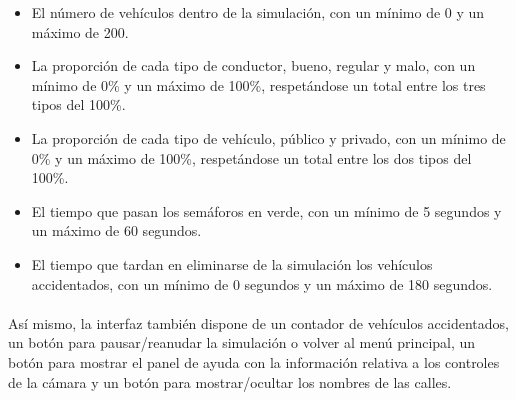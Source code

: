 	\begin{itemize}
	\item El número de vehículos dentro de la simulación, con un mínimo de 0 y un máximo de 200.
	\item La proporción de cada tipo de conductor, bueno, regular y malo, con un mínimo de 0\% y un máximo de 100\%, respetándose un total entre los tres tipos del 100\%.
	\item La proporción de cada tipo de vehículo, público y privado, con un mínimo de 0\% y un máximo de 100\%, respetándose un total entre los dos tipos del 100\%.
	\item El tiempo que pasan los semáforos en verde, con un mínimo de 5 segundos y un máximo de 60 segundos.
	\item El tiempo que tardan en eliminarse de la simulación los vehículos accidentados, con un mínimo de 0 segundos y un máximo de 180 segundos.
	\end{itemize}
	
	\paragraph{}
	Así mismo, la interfaz también dispone de un contador de vehículos accidentados, un botón para pausar/reanudar la simulación o volver al menú principal, un botón para mostrar el panel de ayuda con la información relativa a los controles de la cámara y un botón para mostrar/ocultar los nombres de las calles.
	